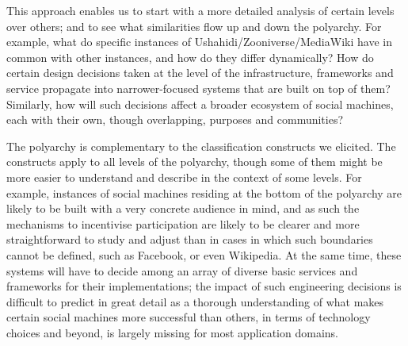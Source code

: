 \documentclass{www13-companion-accepted}
\begin{document}
This approach enables us to start with a more detailed analysis of certain levels over others;
and to see what similarities flow up and down the polyarchy. For example, what do
specific instances of Ushahidi/Zooniverse/MediaWiki have in common with other instances, and
how do they differ dynamically? How do certain design decisions taken at the level of the infrastructure, frameworks and service propagate into narrower-focused systems that are built on top of them? Similarly, how will such decisions affect a broader ecosystem of social machines, each with their own, though overlapping, purposes and communities?

The polyarchy is complementary to the classification constructs we elicited. The constructs apply to all levels of the polyarchy, though some of them might be more easier to understand and describe in the context of some levels. For example, instances of social machines residing at the bottom of the polyarchy are likely to be built with a very concrete audience in mind, and as such the mechanisms to incentivise participation are likely to be clearer and more straightforward to study and adjust than in cases in which such boundaries cannot be defined, such as Facebook, or even Wikipedia. At the same time, these systems will have to decide among an array of diverse basic services and frameworks for their implementations; the impact of such engineering decisions is difficult to predict in great detail as a thorough understanding of what makes certain social machines more successful than others, in terms of technology choices and beyond, is largely missing for most application domains.

\end{document}
